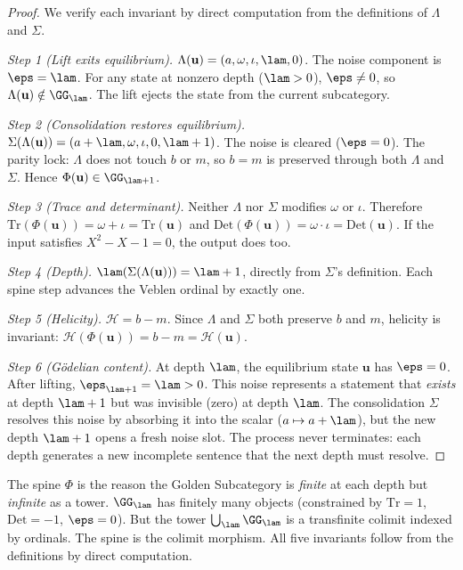 \begin{proof}
We verify each invariant by direct computation from the definitions of $\Lambda$ and $\Sigma$.

\emph{Step 1 (Lift exits equilibrium).} $\Lambda(\mathbf{u}) = (a, \omega, \iota, \lam, 0)$. The noise component is $\eps = \lam$. For any state at nonzero depth ($\lam > 0$), $\eps \neq 0$, so $\Lambda(\mathbf{u}) \notin \GG_{\lam}$. The lift ejects the state from the current subcategory.

\emph{Step 2 (Consolidation restores equilibrium).} $\Sigma(\Lambda(\mathbf{u})) = (a + \lam, \omega, \iota, 0, \lam + 1)$. The noise is cleared ($\eps = 0$). The parity lock: $\Lambda$ does not touch $b$ or $m$, so $b = m$ is preserved through both $\Lambda$ and $\Sigma$. Hence $\Phi(\mathbf{u}) \in \GG_{\lam+1}$.

\emph{Step 3 (Trace and determinant).} Neither $\Lambda$ nor $\Sigma$ modifies $\omega$ or $\iota$. Therefore $\mathrm{Tr}(\Phi(\mathbf{u})) = \omega + \iota = \mathrm{Tr}(\mathbf{u})$ and $\mathrm{Det}(\Phi(\mathbf{u})) = \omega \cdot \iota = \mathrm{Det}(\mathbf{u})$. If the input satisfies $X^2 - X - 1 = 0$, the output does too.

\emph{Step 4 (Depth).} $\lam(\Sigma(\Lambda(\mathbf{u}))) = \lam + 1$, directly from $\Sigma$'s definition. Each spine step advances the Veblen ordinal by exactly one.

\emph{Step 5 (Helicity).} $\mathcal{H} = b - m$. Since $\Lambda$ and $\Sigma$ both preserve $b$ and $m$, helicity is invariant: $\mathcal{H}(\Phi(\mathbf{u})) = b - m = \mathcal{H}(\mathbf{u})$.

\emph{Step 6 (G\"odelian content).} At depth $\lam$, the equilibrium state $\mathbf{u}$ has $\eps = 0$. After lifting, $\eps_{\lam+1} = \lam > 0$. This noise represents a statement that \emph{exists} at depth $\lam + 1$ but was invisible (zero) at depth $\lam$. The consolidation $\Sigma$ resolves this noise by absorbing it into the scalar ($a \mapsto a + \lam$), but the new depth $\lam + 1$ opens a fresh noise slot. The process never terminates: each depth generates a new incomplete sentence that the next depth must resolve. \qedhere
\end{proof}

\begin{remark}
The spine $\Phi$ is the reason the Golden Subcategory is \emph{finite} at each depth but \emph{infinite} as a tower. $\GG_{\lam}$ has finitely many objects (constrained by $\mathrm{Tr} = 1$, $\mathrm{Det} = -1$, $\eps = 0$). But the tower $\bigcup_{\lam} \GG_{\lam}$ is a transfinite colimit indexed by ordinals. The spine is the colimit morphism. All five invariants follow from the definitions by direct computation.
\end{remark}

